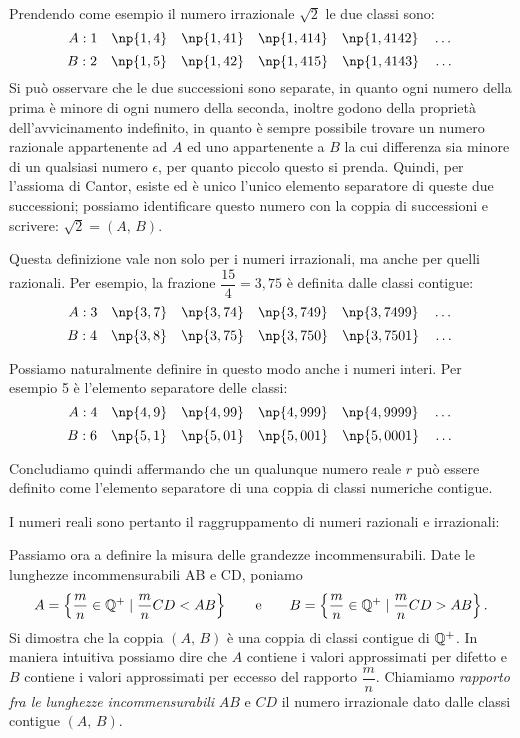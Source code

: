 Prendendo come esempio il numero irrazionale $\sqrt{2}$ le due classi sono:
\[A: 1\quad \np{1,4}\quad \np{1,41}\quad \np{1,414}\quad \np{1,4142}\quad \ldots{}\]
\[B: 2\quad \np{1,5}\quad \np{1,42}\quad \np{1,415}\quad \np{1,4143}\quad \ldots{}\]
Si può osservare che le due successioni sono separate, in quanto ogni numero della prima è minore di ogni numero della seconda, inoltre godono della proprietà dell'avvicinamento indefinito, in quanto è sempre possibile trovare un numero razionale appartenente ad $A$ ed uno appartenente a $B$ la cui differenza sia minore di un qualsiasi numero $\epsilon$, per quanto piccolo questo si prenda.
Quindi, per l'assioma di Cantor, esiste ed è unico l'unico elemento separatore di queste due successioni; possiamo identificare questo numero con la coppia di successioni e scrivere: $\sqrt{2} = (A\text{, }B)$.

Questa definizione vale non solo per i numeri irrazionali, ma anche per quelli razionali. Per esempio, la frazione $\dfrac{15}{4}=3,75$ è definita dalle classi contigue:
\[A: 3\quad \np{3,7}\quad \np{3,74}\quad \np{3,749}\quad \np{3,7499}\quad \ldots{}\]
\[B: 4\quad \np{3,8}\quad \np{3,75}\quad \np{3,750}\quad \np{3,7501}\quad \ldots{}\]

Possiamo naturalmente definire in questo modo anche i numeri interi. Per esempio 5 è l'elemento separatore delle classi:
\[A: 4\quad \np{4,9}\quad \np{4,99}\quad \np{4,999}\quad \np{4,9999}\quad \ldots{}\]
\[B: 6\quad \np{5,1}\quad \np{5,01}\quad \np{5,001}\quad \np{5,0001}\quad \ldots{}\]

Concludiamo quindi affermando che un qualunque numero reale $r$ può essere definito come l'elemento separatore di una coppia di classi numeriche contigue.

\pagebreak

I numeri reali sono pertanto il raggruppamento di numeri razionali e irrazionali:

\begin{figure}[!htb]
	\centering
\end{figure}

Passiamo ora a definire la misura delle grandezze incommensurabili.
Date le lunghezze incommensurabili AB e CD, poniamo
\[A=\left\{\dfrac{m}{n}\in\mathbb{Q}^+\mid\dfrac{m}{n}CD<AB\right\}\qquad\text{e}\qquad B=\left\{\dfrac{m}{n}\in\mathbb{Q}^+\mid\dfrac{m}{n}CD>AB\right\}.\]
Si dimostra che la coppia $(A\text{, }B)$ è una coppia di classi contigue di $\mathbb{Q}^+$. In maniera intuitiva possiamo dire che $A$ contiene i valori approssimati per difetto e $B$ contiene i valori approssimati per eccesso del rapporto $\dfrac{m}{n}$.
Chiamiamo \emph{rapporto fra le lunghezze incommensurabili} $AB$ e $CD$ il numero irrazionale dato dalle classi contigue $(A\text{, }B)$.


